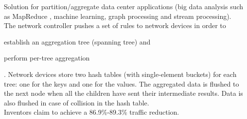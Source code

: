 Solution for partition/aggregate data center applications (big data analysis such as MapReduce \cite{mapreduce}, machine learning, graph processing and stream processing).\\
The network controller pushes a set of rules to network devices in order to
\begin{mylist}
    \item establish an aggregation tree (spanning tree) and
    \item perform per-tree aggregation
\end{mylist}. Network devices store two hash tables (with single-element buckets) for each tree: one for the keys and one for the values. The aggregated data is flushed to the next node when all the children have sent their intermediate results. Data is also flushed in case of collision in the hash table.\\
Inventors claim to achieve a 86.9\%-89.3\% traffic reduction.